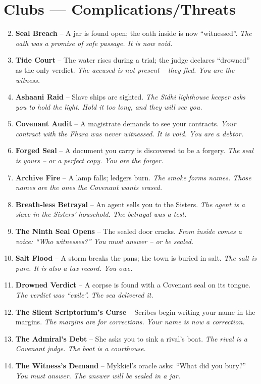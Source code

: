 \documentclass[11pt]{book}
\begin{document}
\section*{Clubs — Complications/Threats}
\begin{enumerate}
\setcounter{enumi}{1}
\item \textbf{Seal Breach} – A jar is found open; the oath inside is now “witnessed”. \textit{The oath was a promise of safe passage. It is now void.}
\item \textbf{Tide Court} – The water rises during a trial; the judge declares “drowned” as the only verdict. \textit{The accused is not present – they fled. You are the witness.}
\item \textbf{Ashaani Raid} – Slave ships are sighted. \textit{The Sidhi lighthouse keeper asks you to hold the light. Hold it too long, and they will see you.}
\item \textbf{Covenant Audit} – A magistrate demands to see your contracts. \textit{Your contract with the Fhara was never witnessed. It is void. You are a debtor.}
\item \textbf{Forged Seal} – A document you carry is discovered to be a forgery. \textit{The seal is yours – or a perfect copy. You are the forger.}
\item \textbf{Archive Fire} – A lamp falls; ledgers burn. \textit{The smoke forms names. Those names are the ones the Covenant wants erased.}
\item \textbf{Breath‑less Betrayal} – An agent sells you to the Sisters. \textit{The agent is a slave in the Sisters’ household. The betrayal was a test.}
\item \textbf{The Ninth Seal Opens} – The sealed door cracks. \textit{From inside comes a voice: “Who witnesses?” You must answer – or be sealed.}
\item \textbf{Salt Flood} – A storm breaks the pans; the town is buried in salt. \textit{The salt is pure. It is also a tax record. You owe.}
\item[J] \textbf{Drowned Verdict} – A corpse is found with a Covenant seal on its tongue. \textit{The verdict was “exile”. The sea delivered it.}
\item[Q] \textbf{The Silent Scriptorium’s Curse} – Scribes begin writing your name in the margins. \textit{The margins are for corrections. Your name is now a correction.}
\item[K] \textbf{The Admiral’s Debt} – She asks you to sink a rival’s boat. \textit{The rival is a Covenant judge. The boat is a courthouse.}
\item[A] \textbf{The Witness’s Demand} – Mykkiel’s oracle asks: “What did you bury?” \textit{You must answer. The answer will be sealed in a jar.}
\end{enumerate}
\end{document}
